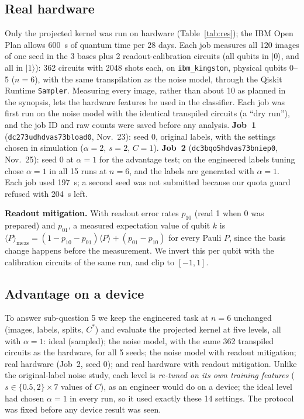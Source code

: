 \documentclass[conference]{IEEEtran}
\begin{document}
\subsection{Real hardware}\label{sec:hw}
Only the projected kernel was run on hardware (Table~\ref{tab:res}); the IBM Open Plan allows 600~s of quantum time per 28 days. Each job measures all 120 images of one seed in the 3 bases plus 2 readout-calibration circuits (all qubits in $|0\rangle$, and all in $|1\rangle$): 362 circuits with 2048 shots each, on \texttt{ibm\_kingston}, physical qubits 0--5 ($n=6$), with the same transpilation as the noise model, through the Qiskit Runtime \texttt{Sampler}. Measuring every image, rather than about 10 as planned in the synopsis, lets the hardware features be used in the classifier. Each job was first run on the noise model with the identical transpiled circuits (a ``dry run''), and the job ID and raw counts were saved before any analysis. \textbf{Job~1} (\texttt{dc273udhdvas73bload0}, Nov.~23): seed 0, original labels, with the settings chosen in simulation ($\alpha=2$, $s=2$, $C=1$). \textbf{Job~2} (\texttt{dc3bqo5hdvas73bniep0}, Nov.~25): seed 0 at $\alpha=1$ for the advantage test; on the engineered labels tuning chose $\alpha=1$ in all 15 runs at $n=6$, and the labels are generated with $\alpha=1$. Each job used 197~s; a second seed was not submitted because our quota guard refused with 204~s left.

\textbf{Readout mitigation.} With readout error rates $p_{10}$ (read 1 when 0 was prepared) and $p_{01}$, a measured expectation value of qubit $k$ is $\langle P\rangle_{\mathrm{meas}}=(1-p_{10}-p_{01})\langle P\rangle+(p_{01}-p_{10})$ for every Pauli $P$, since the basis change happens before the measurement. We invert this per qubit with the calibration circuits of the same run, and clip to $[-1,1]$.

\subsection{Advantage on a device}\label{sec:advexp}
To answer sub-question 5 we keep the engineered task at $n=6$ unchanged (images, labels, splits, $C^\ast$) and evaluate the projected kernel at five levels, all with $\alpha=1$: ideal (sampled); the noise model, with the same 362 transpiled circuits as the hardware, for all 5 seeds; the noise model with readout mitigation; real hardware (Job~2, seed 0); and real hardware with readout mitigation. Unlike the original-label noise study, each level is \emph{re-tuned on its own training features} ($s\in\{0.5,2\}\times7$ values of $C$), as an engineer would do on a device; the ideal level had chosen $\alpha=1$ in every run, so it used exactly these 14 settings. The protocol was fixed before any device result was seen.
\end{document}
